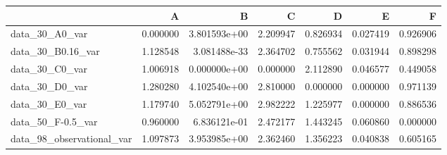 \begin{tabular}{lrrrrrr}
\toprule
{} &         A &             B &         C &         D &         E &         F \\
\midrule
data\_30\_A0\_var            &  0.000000 &  3.801593e+00 &  2.209947 &  0.826934 &  0.027419 &  0.926906 \\
data\_30\_B0.16\_var         &  1.128548 &  3.081488e-33 &  2.364702 &  0.755562 &  0.031944 &  0.898298 \\
data\_30\_C0\_var            &  1.006918 &  0.000000e+00 &  0.000000 &  2.112890 &  0.046577 &  0.449058 \\
data\_30\_D0\_var            &  1.280280 &  4.102540e+00 &  2.810000 &  0.000000 &  0.000000 &  0.971139 \\
data\_30\_E0\_var            &  1.179740 &  5.052791e+00 &  2.982222 &  1.225977 &  0.000000 &  0.886536 \\
data\_50\_F-0.5\_var         &  0.960000 &  6.836121e-01 &  2.472177 &  1.443245 &  0.060860 &  0.000000 \\
data\_98\_observational\_var &  1.097873 &  3.953985e+00 &  2.362460 &  1.356223 &  0.040838 &  0.605165 \\
\bottomrule
\end{tabular}
